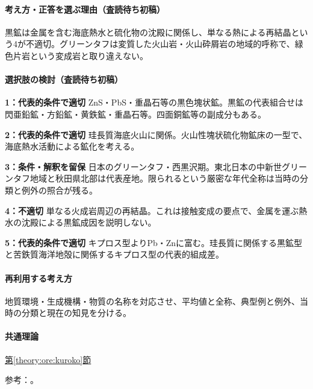 \paragraph{考え方・正答を選ぶ理由（査読待ち初稿）} 黒鉱は金属を含む海底熱水と硫化物の沈殿に関係し、単なる熱による再結晶という4が不適切。グリーンタフは変質した火山岩・火山砕屑岩の地域的呼称で、緑色片岩という変成岩と取り違えない。

\paragraph{選択肢の検討（査読待ち初稿）}\mbox{}\par

\noindent\textbf{1：代表的条件で適切} ZnS・PbS・重晶石等の黒色塊状鉱。黒鉱の代表組合せは閃亜鉛鉱・方鉛鉱・黄鉄鉱・重晶石等。四面銅鉱等の副成分もある。\par

\noindent\textbf{2：代表的条件で適切} 珪長質海底火山に関係。火山性塊状硫化物鉱床の一型で、海底熱水活動による鉱化を考える。\par

\noindent\textbf{3：条件・解釈を留保} 日本のグリーンタフ・西黒沢期。東北日本の中新世グリーンタフ地域と秋田県北部は代表産地。限られるという厳密な年代全称は当時の分類と例外の照合が残る。\par

\noindent\textbf{4：不適切} 単なる火成岩周辺の再結晶。これは接触変成の要点で、金属を運ぶ熱水の沈殿による黒鉱成因を説明しない。\par

\noindent\textbf{5：代表的条件で適切} キプロス型よりPb・Znに富む。珪長質に関係する黒鉱型と苦鉄質海洋地殻に関係するキプロス型の代表的組成差。\par

\paragraph{再利用する考え方} 地質環境・生成機構・物質の名称を対応させ、平均値と全称、典型例と例外、当時の分類と現在の知見を分ける。

\paragraph{共通理論} \hyperref[theory:ore:kuroko]{第\ref*{theory:ore:kuroko}節}

\par 参考：\cite{ore50_kuroko_ref,ore50_backarc_ref}。

